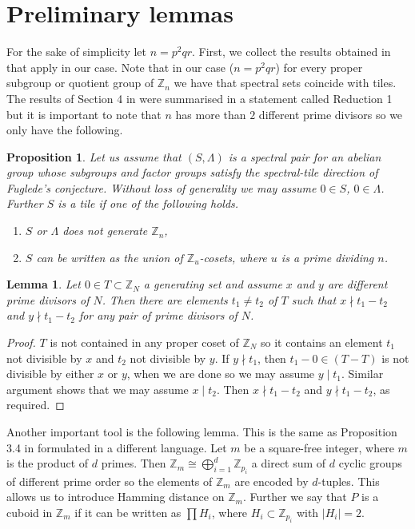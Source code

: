 \documentclass[10pt]{article}
\newcommand{\Z}{\mathbb{Z}}
\newcommand{\La}{\Lambda}
\newtheorem{prop}[Thme]{Proposition}
\newtheorem{lem}[Thme]{Lemma}
\begin{document}
        \section{Preliminary lemmas}
        For the sake of simplicity let $n=p^2qr$.
        First, we collect the results obtained in \cite{negyen} that apply in our case. Note that in our case ($n=p^2qr$) for every proper subgroup or quotient group of $\Z_n$ we have that spectral sets coincide with tiles. 
        The results of Section 4 in \cite{negyen} were summarised in a statement called Reduction 1 but it is important to note that $n$ has more than $2$ different prime divisors so we only have the following. 
        \begin{prop}\label{propreduction}
        Let us assume that $(S,\La)$ is a spectral pair for an abelian group whose subgroups and factor groups satisfy the spectral-tile direction of Fuglede's conjecture. Without loss of generality we may assume $0 \in S$, $0 \in \La$. Further $S$ is a tile if one of the following holds. 
        \begin{enumerate}
            \item\label{itemreductiona} $S$ or $\La$ does not generate $\Z_n$, 
            \item\label{itemreductionb} $S$ can be written as the union of $\Z_u$-cosets, where $u$ is a prime dividing $n$.
        \end{enumerate}
        \end{prop}
        \begin{lem}\label{lempqnemoszt}
        Let $0 \in T \subset \Z_N$ a generating set and assume $x$ and $y$ are different prime divisors of $N$. Then there are elements $t_1 \ne t_2$ of $T$ such that $x \nmid t_1-t_2$ and $y \nmid t_1-t_2$ for any pair of prime divisors of $N$.
        \end{lem}
        \begin{proof}
        $T$ is not contained in any proper coset of $\Z_N$ so it contains an element $t_1$ not divisible by $x$ and $t_2$ not divisible by $y$. If $y \nmid t_1$, then $t_1-0 \in (T -T)$ is not divisible by either $x$ or $y$, when we are done so we may assume $y \mid t_1$. 
        Similar argument shows that we may assume $x \mid t_2$. Then $x \nmid t_1-t_2$ and $y \nmid t_1-t_2$, as required. 
        \end{proof}
        Another important tool is the following lemma. This is the same as Proposition 3.4 in \cite{negyen} formulated in a different language. Let $m$ be a square-free integer, where $m$ is the product of $d$ primes. Then $\Z_m \cong \bigoplus_{i=1}^d\Z_{p_i}$ a direct sum of $d$ cyclic groups of different  prime order so the elements of $\Z_m$ are encoded by $d$-tuples. This allows us to introduce Hamming distance on $\Z_m$. Further we say that $P$ is a cuboid in $\Z_m$ if it can be written as $\prod H_i$, where $H_i \subset \Z_{p_i}$ with $|H_i|=2$. 
\end{document}
